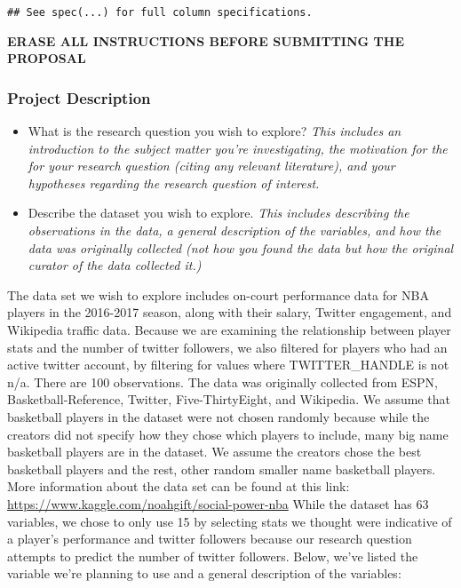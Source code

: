\documentclass[]{article}
\begin{document}
\begin{verbatim}
## See spec(...) for full column specifications.
\end{verbatim}

\textbf{ERASE ALL INSTRUCTIONS BEFORE SUBMITTING THE PROPOSAL}

\hypertarget{project-description}{%
\subsubsection{Project Description}\label{project-description}}

\begin{itemize}
\item
  What is the research question you wish to explore? \emph{This includes
  an introduction to the subject matter you're investigating, the
  motivation for the for your research question (citing any relevant
  literature), and your hypotheses regarding the research question of
  interest.}
\item
  Describe the dataset you wish to explore. \emph{This includes
  describing the observations in the data, a general description of the
  variables, and how the data was originally collected (not how you
  found the data but how the original curator of the data collected
  it.)}
\end{itemize}

The data set we wish to explore includes on-court performance data for
NBA players in the 2016-2017 season, along with their salary, Twitter
engagement, and Wikipedia traffic data. Because we are examining the
relationship between player stats and the number of twitter followers,
we also filtered for players who had an active twitter account, by
filtering for values where TWITTER\_HANDLE is not n/a. There are 100
observations. The data was originally collected from ESPN,
Basketball-Reference, Twitter, Five-ThirtyEight, and Wikipedia. We
assume that basketball players in the dataset were not chosen randomly
because while the creators did not specify how they chose which players
to include, many big name basketball players are in the dataset. We
assume the creators chose the best basketball players and the rest,
other random smaller name basketball players. More information about the
data set can be found at this link:
\url{https://www.kaggle.com/noahgift/social-power-nba} While the dataset
has 63 variables, we chose to only use 15 by selecting stats we thought
were indicative of a player's performance and twitter followers because
our research question attempts to predict the number of twitter
followers. Below, we've listed the variable we're planning to use and a
general description of the variables:
\end{document}
